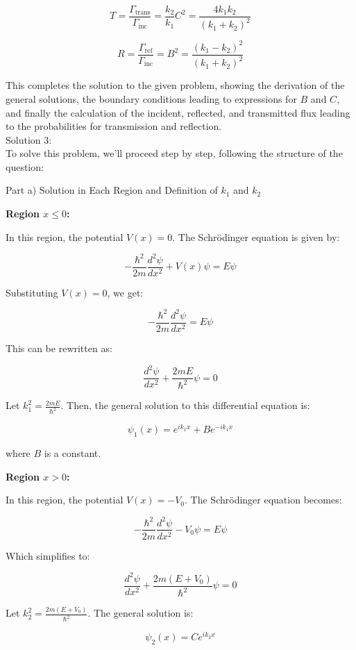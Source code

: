 \documentclass[a4paper,11pt]{article}
\begin{document}
\[
T = \frac{\Gamma_{\text{trans}}}{\Gamma_{\text{inc}}} = \frac{k_2}{k_1}C^2 = \frac{4k_1k_2}{(k_1+k_2)^2}
\]

\[
R = \frac{\Gamma_{\text{ref}}}{\Gamma_{\text{inc}}} = B^2 = \frac{(k_1-k_2)^2}{(k_1+k_2)^2}
\]

This completes the solution to the given problem, showing the derivation of the general solutions, the boundary conditions leading to expressions for \(B\) and \(C\), and finally the calculation of the incident, reflected, and transmitted flux leading to the probabilities for transmission and reflection. \\ 

\noindent Solution 3: \\

To solve this problem, we'll proceed step by step, following the structure of the question:

Part a) Solution in Each Region and Definition of \(k_1\) and \(k_2\)

\textbf{Region \(x \leq 0\):}

In this region, the potential \(V(x) = 0\). The Schrödinger equation is given by:

\[
-\frac{\hbar^2}{2m} \frac{d^2\psi}{dx^2} + V(x)\psi = E\psi
\]

Substituting \(V(x) = 0\), we get:

\[
-\frac{\hbar^2}{2m} \frac{d^2\psi}{dx^2} = E\psi
\]

This can be rewritten as:

\[
\frac{d^2\psi}{dx^2} + \frac{2mE}{\hbar^2}\psi = 0
\]

Let \(k_1^2 = \frac{2mE}{\hbar^2}\). Then, the general solution to this differential equation is:

\[
\psi_1(x) = e^{ik_1x} + Be^{-ik_1x}
\]

where \(B\) is a constant.

\textbf{Region \(x > 0\):}

In this region, the potential \(V(x) = -V_0\). The Schrödinger equation becomes:

\[
-\frac{\hbar^2}{2m} \frac{d^2\psi}{dx^2} - V_0\psi = E\psi
\]

Which simplifies to:

\[
\frac{d^2\psi}{dx^2} + \frac{2m(E+V_0)}{\hbar^2}\psi = 0
\]

Let \(k_2^2 = \frac{2m(E+V_0)}{\hbar^2}\). The general solution is:

\[
\psi_2(x) = Ce^{ik_2x}
\]
\end{document}
